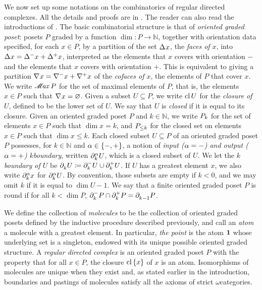 We now set up some notations on the combinatorics of regular directed complexes.
All the details and proofs are in \cite{hadzihasanovic2024combinatorics}.
The reader can also read the introductions of \cite{chanavat2024htpy, chanavat2024equivalences, chanavat2024model}.
The basic combinatorial structure is that of \emph{oriented graded poset}: posets \( P \) graded by a function \( \dim \colon P \to \mathbb{N} \), together with orientation data specified, for each \( x \in P \), by a partition of the set \( \faces{}{} x \), the \emph{faces of \( x \)}, into \( \faces{}{} x = \faces{}{-} x + \faces{}{+} x \), interpreted as the elements that \( x \) covers with orientation \( - \) and the elements that \( x \) covers with orientation \( + \). 
This is equivalent to giving a partition \( \cofaces{}{} x = \cofaces{}{-} x + \cofaces{}{+} x \) of the \emph{cofaces of \( x \)}, the elements of \( P \) that cover \( x \).
We write \( \maxel{P} \) for the set of maximal elements of \( P \), that is, the elements \( x \in P \) such that \( \cofaces{}{} x = \varnothing \).
Given a subset \( U \subseteq P \), we write \( \clos U \) for the \emph{closure of \( U \)}, defined to be the lower set of \( U \). 
We say that \( U \) is \emph{closed} if it is equal to its closure.
Given an oriented graded poset \( P \) and \( k \in \mathbb{N} \), we write \( \gr{k}{P} \) for the set of elements \( x \in P \) such that \( \dim x = k \), and \( \gr{\le k}{P} \) for the closed set on elements \( x \in P \) such that \( \dim x \le k \). 
Each closed subset \( U \subseteq P \) of an oriented graded poset \( P \) possesses, for \( k \in \mathbb{N} \) and \( \a \in \set{-, +} \), a notion of \emph{input (\( \a = - \)) and output (\( \a = + \)) \( k \)\nbd boundary}, written \( \bd{k}{\a} U \), which is a closed subset of \( U \). 
We let the \emph{\( k \)\nbd boundary of \( U \)} be \( \bd{k}{} U \eqdef \bd{k}{-} U \cup \bd{k}{+} U \).
If \( U \) has a greatest element \( x \), we also write \( \bd{k}{\a} x \) for \( \bd{k}{\a} U \).
By convention, those subsets are empty if \( k < 0 \), and we may omit \( k \) if it is equal to \( \dim U - 1 \).
We say that a finite oriented graded poset \( P \) is round if for all \( k < \dim P  \), \( \bd{k}{-} P \cap \bd{k}{+} P = \bd{k - 1}{} P \).

We define the collection of \emph{molecules} to be the collection of oriented graded posets defined by the inductive procedure described previously, and call an \emph{atom} a molecule with a greatest element.
In particular, \emph{the point} is the atom \( \pt \) whose underlying set is a singleton, endowed with its unique possible oriented graded structure. 
A \emph{regular directed complex} is an oriented graded poset \( P \) with the property that for all \( x \in P \), the closure \( \clset{x} \) of \( x \) is an atom.
Isomorphisms of molecules are unique when they exist and, as stated earlier in the introduction, boundaries and pastings of molecules satisfy all the axioms of strict \( \omega \)\nbd categories.

